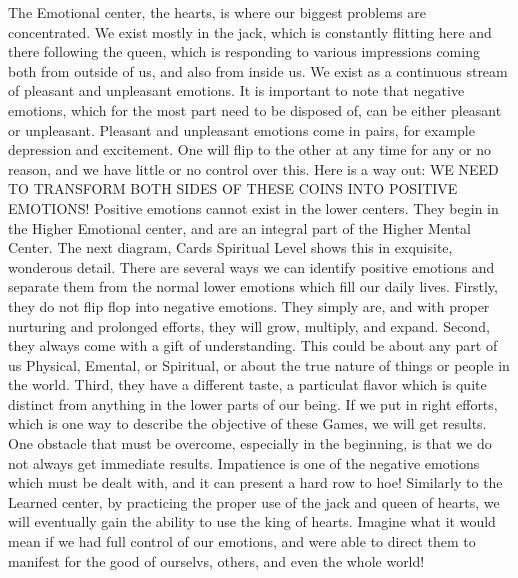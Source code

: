 \documentclass[12pt,letterpaper]{book}
\begin{document}
The Emotional center, the hearts, is where our biggest problems are concentrated. We exist mostly in the jack, which is constantly flitting here and there following the queen, which is responding to various impressions coming both from outside of us, and also from inside us. We exist as a continuous stream of pleasant and unpleasant emotions. It is important to note that negative emotions, which for the most part need to be disposed of, can be either pleasant or unpleasant. Pleasant and unpleasant emotions come in pairs, for example depression and excitement. One will flip to the other at any time for any or no reason, and we have little or no control over this. Here is a way out: WE NEED TO TRANSFORM BOTH SIDES OF THESE COINS INTO POSITIVE EMOTIONS! Positive emotions cannot exist in the lower centers. They begin in the Higher Emotional center, and are an integral part of the Higher Mental Center. The next diagram, Cards Spiritual Level shows this in exquisite, wonderous detail. There are several ways we can identify positive emotions and separate them from the normal lower emotions which fill our daily lives. Firstly, they do not flip flop into negative emotions. They simply are, and with proper nurturing and prolonged efforts, they will grow, multiply, and expand. Second, they always come with a gift of understanding. This could be about any part of us Physical, Emental, or Spiritual, or about the true nature of things or people in the world. Third, they have a different taste, a particulat flavor which is quite distinct from anything in the lower parts of our being. If we put in right efforts, which is one way to describe the objective of these Games, we will get results. One obstacle that must be overcome, especially in the beginning, is that we do not always get immediate results. Impatience is one of the negative emotions which must be dealt with, and it can present a hard row to hoe! Similarly to the Learned center, by practicing the proper use of the jack and queen of hearts, we will eventually gain the ability to use the king of hearts. Imagine what it would mean if we had full control of our emotions, and were able to direct them to manifest for the good of ourselvs, others, and even the whole world!
\end{document}
